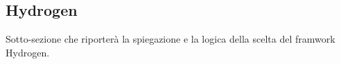 \subsection{Hydrogen}

Sotto-sezione che riporterà la spiegazione e la logica della scelta del framwork Hydrogen.